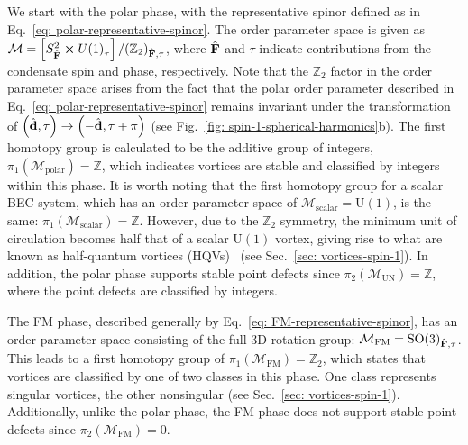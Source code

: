 We start with the polar phase, with the representative spinor defined as in
Eq.~\eqref{eq: polar-representative-spinor}.
The order parameter space is given as \(\mathcal{M} = \left[S^2_{\hat{\vb{F}}}
\cross {U(1)}_\tau\right] / {({\mathbb{Z}}_2)}_{\hat{\vb{F}}, \tau} \), where
\(\hat{\vb{F}}\) and \(\tau \) indicate contributions from the condensate spin
and phase, respectively.
Note that the \(\mathbb{Z}_2\) factor in the order parameter space arises from
the fact that the polar order parameter described in
Eq.~\eqref{eq: polar-representative-spinor} remains invariant under the
transformation of \(\left(\hat{\vb{d}}, \tau\right)
\rightarrow \left(-\hat{\vb{d}}, \tau+\pi\right)\)
(see Fig.~\ref{fig: spin-1-spherical-harmonics}b).
The first homotopy group is calculated to be the additive group of integers,
\(\pi_1(\mathcal{M}_\text{polar}) = \mathbb{Z}\), which indicates vortices are
stable and classified by integers within this phase.
It is worth noting that the first homotopy group for a scalar BEC system,
which has an order parameter space of \(\mathcal{M}_\text{scalar}
= \text{U}(1)\), is the same: \(\pi_1(\mathcal{M}_\text{scalar}) = \mathbb{Z}\).
However, due to the \({\mathbb{Z}}_2\) symmetry, the minimum unit of circulation
becomes half that of a scalar \(\text{U}(1)\) vortex, giving rise to what are
known as half-quantum vortices (HQVs)~\cite{Kawaguchi2012} (see
Sec.~\ref{sec: vortices-spin-1}).
In addition, the polar phase supports stable point defects since
\(\pi_2(\mathcal{M}_\text{UN}) = \mathbb{Z}\), where the point defects are
classified by integers.

The FM phase, described generally by Eq.~\eqref{eq: FM-representative-spinor},
has an order parameter space consisting of the full 3D rotation group:
\(\mathcal{M}_\text{FM} = {\text{SO}(3)}_{\hat{\vb{F}}, \tau}\).
This leads to a first homotopy group of \(\pi_1(\mathcal{M}_\text{FM})
= {\mathbb{Z}}_2\), which states that vortices are classified by one of two
classes in this phase.
One class represents singular vortices, the other nonsingular (see
Sec.~\ref{sec: vortices-spin-1}).
Additionally, unlike the polar phase, the FM phase does not support stable point
defects since \(\pi_2(\mathcal{M}_\text{FM}) = 0\).

